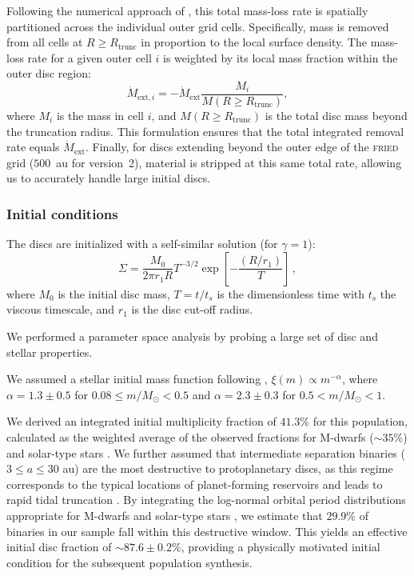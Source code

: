 \documentclass[fleqn,usenatbib]{mnras}
\begin{document}
Following the numerical approach of \citet{2020MNRAS.492.1279S}, this total mass-loss rate is spatially partitioned across the individual outer grid cells. Specifically, mass is removed from all cells at $R \geq R_\mathrm{trunc}$ in proportion to the local surface density. The mass-loss rate for a given outer cell $i$ is weighted by its local mass fraction within the outer disc region:
\begin{equation}
  \dot{M}_{\mathrm{ext}, i} = -\dot{M}_\mathrm{ext} \frac{M_i}{M(R \geq R_\mathrm{trunc})},
\end{equation}
where $M_i$ is the mass in cell $i$, and $M(R \geq R_\mathrm{trunc})$ is the total disc mass beyond the truncation radius. This formulation ensures that the total integrated removal rate equals $\dot{M}_\mathrm{ext}$. Finally, for discs extending beyond the outer edge of the \textsc{fried} grid ($500$~au for version~2), material is stripped at this same total rate, allowing us to accurately handle large initial discs.

\subsubsection{Initial conditions}
The discs are initialized with a self-similar solution (for $\gamma = 1$):
\begin{equation}
    \Sigma = \frac{M_0}{2 \pi r_1 R} T^{-3/2} \exp{\left[-\frac{(R/r_1)}{T}\right]}\,,
\end{equation}
where $M_0$ is the initial disc mass, $T=t/t_s$ is the dimensionless time with $t_s$ the viscous timescale, and $r_1$ is the disc cut-off radius.

We performed a parameter space analysis by probing a large set of disc and stellar properties.

We assumed a stellar initial mass function following \citet{2001MNRAS.322..231K}, $\xi(m)\propto m^{-\alpha}$, where $\alpha = 1.3 \pm 0.5$ for $0.08 \leq m/M_\odot < 0.5$ and $\alpha = 2.3 \pm 0.3$ for $0.5 < m/M_\odot < 1$.

We derived an integrated initial multiplicity fraction of $41.3\%$ for this population, calculated as the weighted average of the observed fractions for M-dwarfs ($\sim 35 \%$) and solar-type stars \citep[$\sim 70 \%$, see e.g.][]{2013ARA&A..51..269D}. 
We further assumed that intermediate separation binaries ($3\leq a \leq 30$ au) are the most destructive to protoplanetary discs, as this regime corresponds to the typical locations of planet-forming reservoirs and leads to rapid tidal truncation \citep[see e.g.][]{2009ApJ...696L..84C, 2012ApJ...745...19K}.
By integrating the log-normal orbital period distributions appropriate for M-dwarfs \citep[peak at $a_b\simeq 20$ au][]{2019AJ....157..216W} and solar-type stars \citep[peak ay $a_b \simeq 50$ au][]{2010ApJS..190....1R}, we estimate that $29.9 \%$ of binaries in our sample fall within this destructive window.
This yields an effective initial disc fraction of $\sim 87.6 \pm 0.2 \%$, providing a physically motivated initial condition for the subsequent population synthesis.
\end{document}
